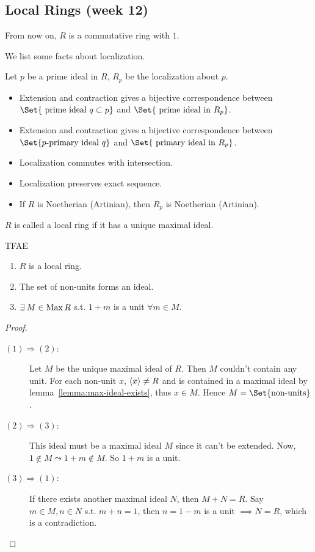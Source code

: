 \subsection{Local Rings (week 12)}

From now on, $R$ is a commutative ring with $1$.

We list some facts about localization.
\begin{prop} \label{prop:property-of-localization}
  Let $p$ be a prime ideal in $R$, $R_p$ be the localization about $p$.
  \begin{itemize}
    \item Extension and contraction gives a bijective correspondence between
      $\Set{ \text{ prime ideal } q \subset p }$ and $\Set{ \text{ prime ideal in } R_p}$.
    \item Extension and contraction gives a bijective correspondence between
      $\Set{ p\text{-primary ideal } q }$ and $\Set{ \text{ primary ideal in } R_p}$.
    \item Localization commutes with intersection.
    \item Localization preserves exact sequence.
    \item If $R$ is Noetherian (Artinian), then $R_p$ is Noetherian (Artinian).
  \end{itemize}
\end{prop}

\begin{definition}
  $R$ is called a local ring if it has a unique maximal ideal.
\end{definition}

\begin{prop}
  TFAE
  \begin{enumerate}[(1)]
    \item $R$ is a local ring.
    \item The set of non-units forms an ideal.
    \item $\exists M \in \Max R$ s.t. $1 + m$ is a unit $\forall m \in M$.
  \end{enumerate}

  \begin{proof} \mbox{}
    \begin{description}
      \item[$(1)\Rightarrow(2)$:]
        Let $M$ be the unique maximal ideal of $R$. Then $M$ couldn't contain
        any unit. For each non-unit $x$,
        $\langle x\rangle \neq R$ and is contained in a maximal ideal by
        lemma~\ref{lemma:max-ideal-exists}, thus $x \in M$.
        Hence $M = \Set{ \text{non-units} }$.
      \item[$(2) \Rightarrow (3)$:]
        This ideal must be a maximal ideal $M$ since it can't be extended.
        Now, $1 \notin M \leadsto 1 + m \notin M$. So $1 + m$ is a unit.
      \item[$(3)\Rightarrow(1)$:]
        If there exists another maximal ideal $N$, then $M + N = R$.
        Say $m \in  M, n \in N$ s.t. $m + n = 1$, then $n = 1 - m$ is a unit
        $\implies N = R$, which is a contradiction.
        \qedhere
    \end{description}
  \end{proof}
\end{prop}

